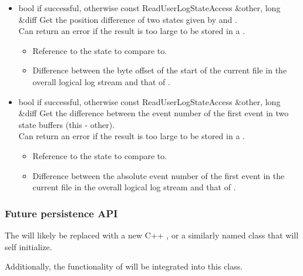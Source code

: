 \begin{itemize}
\begin{itemize}
\item {}
  {bool} { if successful,  otherwise}
  {const ReadUserLogStateAccess \&other, long \&diff}
  {Get the position difference of two states given by  
  and .
    \\ \Note Can return an error if the result is too large
    to be stored in a .}
  \begin{itemize}
  \item {}
    Reference to the state to compare to.
  \item {}
    Difference between the byte offset of the start of the current
    file in the overall logical log stream and that of .
  \end{itemize}

\item {}
  {bool} { if successful,  otherwise}
  {const ReadUserLogStateAccess \&other, long \&diff}
  {Get the difference between the event number of the first event in
    two state buffers (this - other).
    \\ \Note Can return an error if the result is too large
    to be stored in a .}
  \begin{itemize}
  \item {}
    Reference to the state to compare to.
  \item {}
    Difference between the absolute event number of the first event in
    the current file in the overall logical log stream and that of
    .
  \end{itemize}

\end{itemize}	%

\end{itemize}

\subsubsection{Future persistence API}
The  will likely be replaced with a new
C++ , or a similarly named class that
will self initialize.

Additionally, the functionality of  will
be integrated into this class.
